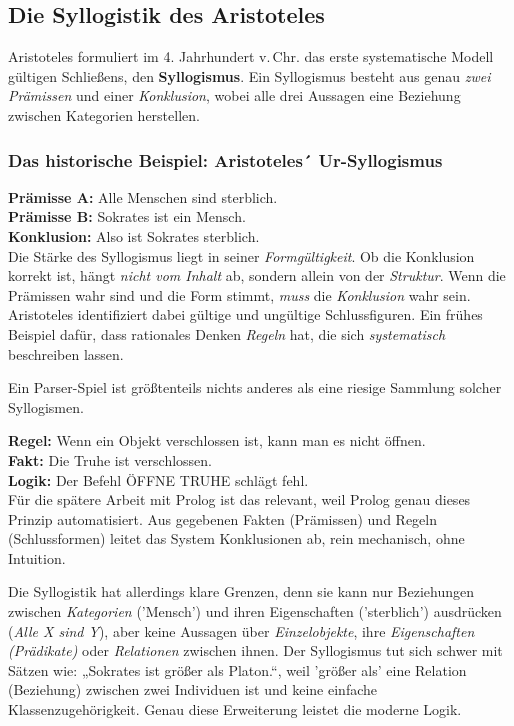 \documentclass[parskip=half,a4paper,11pt]{scrreprt}
\begin{document}
\subsection{Die Syllogistik des Aristoteles}

Aristoteles formuliert im 4. Jahrhundert v.\,Chr. das erste systematische Modell gültigen Schließens, den \textbf{Syllogismus}. Ein Syllogismus besteht aus genau \textit{zwei Prämissen} und einer \textit{Konklusion}, wobei alle drei Aussagen eine Beziehung zwischen Kategorien herstellen.

\subsubsection{Das historische Beispiel: Aristoteles´ Ur-Syllogismus}

\textbf{Prämisse A:} Alle Menschen sind sterblich.\\
\textbf{Prämisse B:} Sokrates ist ein Mensch.\\
\textbf{Konklusion:} Also ist Sokrates sterblich.\\

Die Stärke des Syllogismus liegt in seiner \textit{Formgültigkeit}. Ob die Konklusion korrekt ist, hängt \textit{nicht vom Inhalt} ab, sondern allein von der \textit{Struktur}. Wenn die Prämissen wahr sind und die Form stimmt, \textit{muss} die \textit{Konklusion} wahr sein. Aristoteles identifiziert dabei gültige und ungültige Schlussfiguren. Ein frühes Beispiel dafür, dass rationales Denken \textit{Regeln} hat, die sich \textit{systematisch} beschreiben lassen.

Ein Parser-Spiel ist größtenteils nichts anderes als eine riesige Sammlung solcher Syllogismen.

\textbf{Regel:} Wenn ein Objekt verschlossen ist, kann man es nicht öffnen. \\
\textbf{Fakt:} Die Truhe ist verschlossen. \\
\textbf{Logik:} Der Befehl ÖFFNE TRUHE schlägt fehl. \\

Für die spätere Arbeit mit Prolog ist das relevant, weil Prolog genau dieses Prinzip automatisiert. Aus gegebenen Fakten (Prämissen) und Regeln (Schlussformen) leitet das System Konklusionen ab, rein mechanisch, ohne Intuition.

Die Syllogistik hat allerdings klare Grenzen, denn sie kann nur Beziehungen zwischen \textit{Kategorien} ('Mensch') und ihren Eigenschaften ('sterblich') ausdrücken (\textit{Alle X sind Y}), aber keine Aussagen über \textit{Einzelobjekte}, ihre \textit{Eigenschaften (Prädikate)} oder \textit{Relationen} zwischen ihnen. Der Syllogismus tut sich schwer mit Sätzen wie: „Sokrates ist größer als Platon.“, weil 'größer als' eine Relation (Beziehung) zwischen zwei Individuen ist und keine einfache Klassenzugehörigkeit. Genau diese Erweiterung leistet die moderne Logik.
\end{document}
